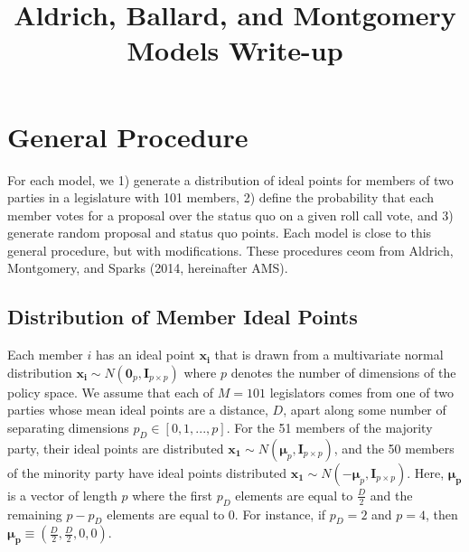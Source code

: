 \documentclass[12pt]{article}
\begin{document}

\title{Aldrich, Ballard, and Montgomery Models Write-up}%



\maketitle

\section*{General Procedure}

For each model, we 1) generate a distribution of ideal points for members of two parties in a legislature with 101 members, 2) define the probability that each member votes for a proposal over the status quo on a given roll call vote, and 3) generate random proposal and status quo points. Each model is close to this general procedure, but with modifications. These procedures ceom from Aldrich, Montgomery, and Sparks (2014, hereinafter AMS).

\subsection*{Distribution of Member Ideal Points}

Each member $i$ has an ideal point $\boldsymbol{x_i}$ that is drawn from a multivariate normal distribution $\boldsymbol{x_i} \sim N(\boldsymbol{0}_p, \boldsymbol{I}_{p \times p})$ where $p$ denotes the number of dimensions of the policy space. We assume that each of $M = 101$ legislators comes from one of two parties whose mean ideal points are a distance, $D$, apart along some number of separating dimensions $p_D \in [0, 1,...,p]$. For the 51 members of the majority party, their ideal points are distributed $\boldsymbol{x_1} \sim N(\boldsymbol{\mu}_p, \boldsymbol{I}_{p \times p})$, and the 50 members of the minority party have ideal points distributed $\boldsymbol{x_1} \sim N(-\boldsymbol{\mu}_p, \boldsymbol{I}_{p \times p})$. Here, $\boldsymbol{\mu_p}$ is a vector of length $p$ where the first $p_D$ elements are equal to $\frac{D}{2}$ and the remaining $p - p_D$ elements are equal to $0$. For instance, if $p_D = 2$ and $p = 4$, then $\boldsymbol{\mu_p} \equiv (\frac{D}{2}, \frac{D}{2}, 0, 0)$.
\end{document}
